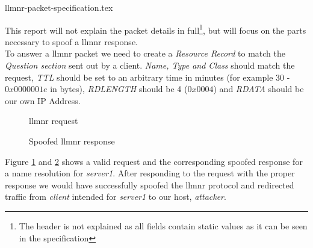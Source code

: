 \documentclass{article}
\begin{document}
{llmnr-packet-specification.tex}

This report will not explain the packet details in full\footnote{The header is not explained as all fields contain static values as it can be seen in the specification\cite{url:rfc:llmnr}}, but will focus on the parts necessary to spoof a \gls{llmnr} response.\\
To answer a \gls{llmnr} packet we need to create a \emph{Resource Record} to match the \emph{Question section} sent out by a client. \emph{Name, Type and Class} should match the request, \emph{TTL} should be set to an arbitrary time in minutes (for example 30 - $0x0000001e$ in bytes), \emph{RDLENGTH} should be 4 ($0x0004$) and \emph{RDATA} should be our own IP Address.

\begin{figure}[H]
	\scriptsize
	\par
	\centering
	\varwidth{\linewidth}
	
	\endvarwidth
    \par
    
    \caption{\gls{llmnr} request}
    \label{fig:llmnr-request}
\end{figure}

\begin{figure}[H]
	\scriptsize
	\par
	\centering
	\varwidth{\linewidth}
	
	\endvarwidth
    \par
    
    \caption{Spoofed \gls{llmnr} response}
    \label{fig:llmnr-response}
\end{figure}

Figure \ref{fig:llmnr-request} and \ref{fig:llmnr-response} shows a valid request and the corresponding spoofed response for a name resolution for \emph{server1}. After responding to the request with the proper response we would have successfully spoofed the \gls{llmnr} protocol and redirected traffic from \emph{client} intended for \emph{server1} to our host, \emph{attacker}.
\end{document}

